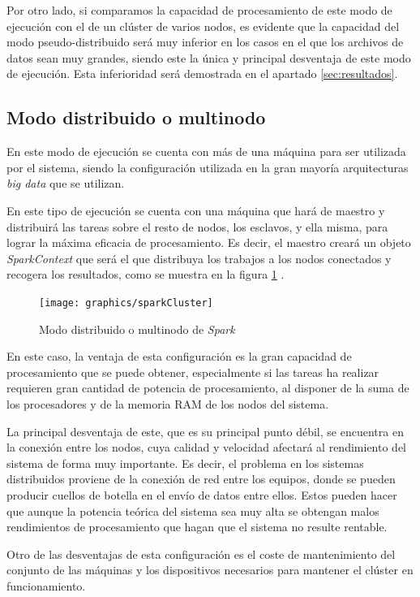 Por otro lado, si comparamos la capacidad de procesamiento de este modo de ejecución con el de un clúster de varios nodos, es evidente que la capacidad del modo pseudo-distribuido será muy inferior en los casos en el que los archivos de datos sean muy grandes, siendo este la única y principal desventaja de este modo de ejecución. Esta inferioridad será demostrada en el apartado \ref{sec:resultados}.

\subsection{Modo distribuido o multinodo \label{disMultinodo}}
En este modo de ejecución se cuenta con más de una máquina para ser utilizada por el sistema, siendo la configuración utilizada en la gran mayoría arquitecturas \textit{big data} que se utilizan. 

En este tipo de ejecución se cuenta con una máquina que hará de maestro y distribuirá las tareas sobre el resto de nodos, los esclavos, y ella misma, para lograr la máxima eficacia de procesamiento. Es decir, el maestro creará un objeto \textit{SparkContext} que será el que distribuya los trabajos a los nodos conectados y recogera los resultados, como se muestra en la figura \ref{fig:clusterSpark} \cite{clusterfoto}.

\begin{figure}[htp!]
\centering
\caption{Modo distribuido o multinodo de \textit{Spark} \cite{clusterfoto}}
\label{fig:clusterSpark}
\texttt{[image: graphics/sparkCluster]}
\end{figure}

En este caso, la ventaja de esta configuración es la gran capacidad de procesamiento que se puede obtener, especialmente si las tareas ha realizar requieren gran cantidad de potencia de procesamiento, al disponer de la suma de los procesadores y de la memoria \gls{RAM} de los nodos del sistema.

La principal desventaja de este, que es su principal punto débil, se encuentra en la conexión entre los nodos, cuya calidad y velocidad afectará al rendimiento del sistema de forma muy importante. Es decir, el problema en los sistemas distribuidos proviene de la conexión de red entre los equipos, donde se pueden producir cuellos de botella en el envío de datos entre ellos. Estos pueden hacer que aunque la potencia teórica del sistema sea muy alta se obtengan malos rendimientos de procesamiento que hagan que el sistema no resulte rentable.

Otro de las desventajas de esta configuración es el coste de mantenimiento del conjunto de las máquinas y los dispositivos necesarios para mantener el clúster en funcionamiento.

